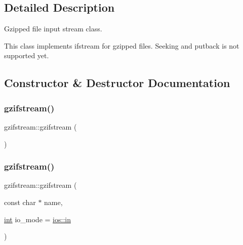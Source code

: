 \subsection{Detailed Description}
Gzipped file input stream class. 

This class implements ifstream for gzipped files. Seeking and putback is not supported yet. 

\subsection{Constructor \& Destructor Documentation}
\mbox{\label{classgzifstream_a6fa19ba2a1eeaeab5f0a408082bc2edd}} 
\subsubsection{\texorpdfstring{gzifstream()}{gzifstream()}\hspace{0.1cm}{\footnotesize\ttfamily [1/6]}}
{\footnotesize\ttfamily gzifstream\+::gzifstream (\begin{DoxyParamCaption}{ }\end{DoxyParamCaption})}

\mbox{\label{classgzifstream_a56e464903ee517fb3377f9d8a2977694}} 
\subsubsection{\texorpdfstring{gzifstream()}{gzifstream()}\hspace{0.1cm}{\footnotesize\ttfamily [2/6]}}
{\footnotesize\ttfamily gzifstream\+::gzifstream (\begin{DoxyParamCaption}\item[{const char $\ast$}]{name,  }\item[{\mbox{\hyperlink{ioapi_8h_a787fa3cf048117ba7123753c1e74fcd6}{int}}}]{io\+\_\+mode = {\ttfamily \mbox{\hyperlink{gun_8c_a8bab68b4d22f69428207fabb60dc4f5c}{ios\+::in}}} }\end{DoxyParamCaption})}

